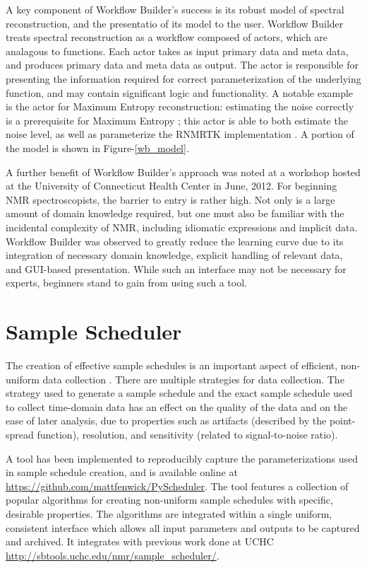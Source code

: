 A key component of Workflow Builder's success is its robust model of spectral
reconstruction, and the presentatio of its model to the user.  Workflow Builder
treats spectral reconstruction as a workflow composed of actors, which are
analagous to functions.  Each actor takes as input primary data and meta data,
and produces primary data and meta data as output.  The actor is responsible
for presenting the information required for correct parameterization of the
underlying function, and may contain significant logic and functionality.  A
notable example is the actor for Maximum Entropy reconstruction:  estimating
the noise correctly is a prerequisite for Maximum Entropy \cite{mobli2010non};
this actor is able to both estimate the noise level, as well as parameterize
the RNMRTK implementation \cite{rnmrtk}.  A portion of the model is shown
in Figure-\ref{wb_model}.

A further benefit of Workflow Builder's approach was noted at a workshop
hosted at the University of Connecticut Health Center in June, 2012.  For
beginning NMR spectroscopists, the barrier to entry is rather high.  Not only
is a large amount of domain knowledge required, but one must also be familiar
with the incidental complexity of NMR, including idiomatic expressions and
implicit data.  Workflow Builder was observed to greatly reduce the learning
curve due to its integration of necessary domain knowledge, explicit handling
of relevant data, and GUI-based presentation.  While such an interface may 
not be necessary for experts, beginners stand to gain from using such a 
tool.


\section{Sample Scheduler}
The creation of effective sample schedules is an important aspect of efficient,
non-uniform data collection 
\cite{maciejewski2011random, rovnyak2004accelerated, mobli2010non}.  There
are multiple strategies for data collection.  The strategy used to generate
a sample schedule and the exact sample schedule used to collect time-domain
data has an effect on the quality of the data and on the ease of later 
analysis, due to properties such as artifacts (described by the point-spread
function), resolution, and sensitivity (related to signal-to-noise ratio).

A tool has been implemented to reproducibly capture the parameterizations
used in sample schedule creation, and is available online at
\url{https://github.com/mattfenwick/PyScheduler}.  The tool features a 
collection of popular algorithms for creating non-uniform sample schedules
with specific, desirable properties.  The algorithms are integrated within
a single uniform, consistent interface which allows all input parameters
and outputs to be captured and archived.  It integrates with previous work
done at UCHC \url{http://sbtools.uchc.edu/nmr/sample_scheduler/}.

